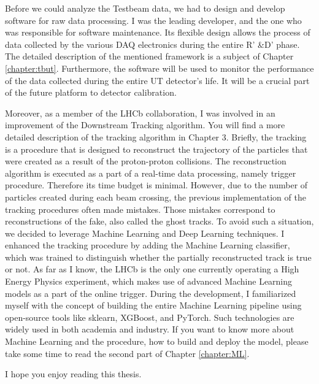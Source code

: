 Before we could analyze the Testbeam data, we had to design and develop software for raw data processing. I was the leading developer, and the one who was responsible for software maintenance.  Its flexible design allows the process of data collected by the various DAQ electronics during the entire R' \&D' phase. The detailed description of the mentioned framework is a subject of Chapter \ref{chapter:tbut}. Furthermore, the software will be used to monitor the performance of the data collected during the entire UT detector's life. It will be a crucial part of the future platform to detector calibration. 


Moreover, as a member of the LHCb collaboration, I was involved in an improvement of the Downstream Tracking algorithm. You will find a more detailed description of the tracking algorithm in Chapter 3. Briefly, the tracking is a procedure that is designed to reconstruct the trajectory of the particles that were created as a result of the proton-proton collisions. The reconstruction algorithm is executed as a part of a real-time data processing, namely trigger procedure. Therefore its time budget is minimal. However, due to the number of particles created during each beam crossing, the previous implementation of the tracking procedures often made mistakes. Those mistakes correspond to reconstructions of the fake, also called the ghost tracks. To avoid such a situation, we decided to leverage Machine Learning and Deep Learning techniques. I enhanced the tracking procedure by adding the Machine Learning classifier, which was trained to distinguish whether the partially reconstructed track is true or not. As far as I know, the LHCb is the only one currently operating a High Energy Physics experiment, which makes use of advanced Machine Learning models as a part of the online trigger. During the development, I familiarized myself with the concept of building the entire Machine Learning pipeline using open-source tools like sklearn, XGBoost, and PyTorch. Such technologies are widely used in both academia and industry. If you want to know more about Machine Learning and the procedure, how to build and deploy the model, please take some time to read the second part of Chapter \ref{chapter:ML}. 


I hope you enjoy reading this thesis. 

